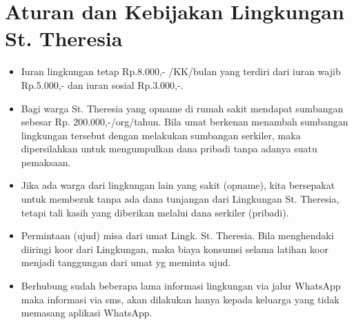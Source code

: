 \section{Aturan dan Kebijakan Lingkungan St. Theresia \tahun} 

\begin{itemize}
\item Iuran lingkungan tetap Rp.8.000,- /KK/bulan yang
terdiri dari iuran wajib Rp.5.000,- dan iuran sosial Rp.3.000,-.
\item Bagi warga St. Theresia yang opname di rumah sakit mendapat sumbangan sebesar
Rp. 200.000,-/org/tahun. Bila umat berkenan menambah sumbangan
lingkungan tersebut dengan melakukan sumbangan serkiler, maka
dipersilahkan untuk mengumpulkan dana pribadi tanpa adanya suatu
pemaksaan. 
\item Jika ada warga dari lingkungan lain yang sakit (opname), kita
bersepakat untuk membezuk tanpa ada dana tunjangan dari Lingkungan St.
Theresia, tetapi tali kasih yang diberikan melalui dana serkiler
(pribadi).
\item Permintaan (ujud) misa dari umat Lingk. St. Theresia. Bila
menghendaki diiringi koor dari Lingkungan, maka biaya konsumsi selama
latihan koor menjadi tanggungan dari umat yg meminta ujud.
\item Berhubung sudah beberapa lama informasi lingkungan via jalur WhatsApp maka informasi via sms, akan dilakukan hanya kepada keluarga yang tidak memasang aplikasi WhatsApp.
\end{itemize}

